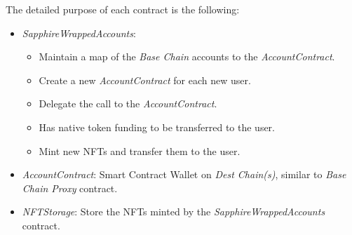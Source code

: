 The detailed purpose of each contract is the following:
\begin{itemize}
    \item \textit{SapphireWrappedAccounts}: 
        \begin{itemize}
            \item Maintain a map of the \textit{Base Chain} accounts to the \textit{AccountContract}. 
            \item Create a new \textit{AccountContract} for each new user.
            \item Delegate the call to the \textit{AccountContract}.
            \item Has native token funding to be transferred to the user. 
            \item Mint new NFTs and transfer them to the user.
        \end{itemize}
    \item \textit{AccountContract}: Smart Contract Wallet on \textit{Dest Chain(s)}, similar to \textit{Base Chain Proxy} contract.
    \item \textit{NFTStorage}: Store the NFTs minted by the \textit{SapphireWrappedAccounts} contract.
\end{itemize}